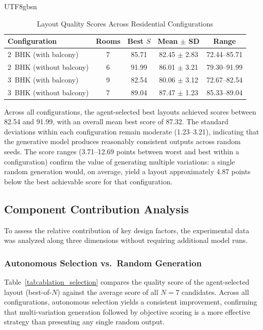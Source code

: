 \documentclass[11pt]{article}
\begin{document}
\begin{CJK}{UTF8}{gbsn}
\begin{table}[!t]
\caption{Layout Quality Scores Across Residential Configurations}
\centering
\begin{tabular}{|l|c|c|c|c|}
\hline
\textbf{Configuration} & \textbf{Rooms} & \textbf{Best $S$} & \textbf{Mean $\pm$ SD} & \textbf{Range} \\
\hline
2~BHK (with balcony) & 7 & 85.71 & 82.45 $\pm$ 2.83 & 72.44--85.71 \\
\hline
2~BHK (without balcony) & 6 & 91.99 & 86.01 $\pm$ 3.21 & 79.30--91.99 \\
\hline
3~BHK (with balcony) & 9 & 82.54 & 80.06 $\pm$ 3.12 & 72.67--82.54 \\
\hline
3~BHK (without balcony) & 7 & 89.04 & 87.47 $\pm$ 1.23 & 85.33--89.04 \\
\hline
\end{tabular}
\label{tab:quality_scores}
\end{table}

Across all configurations, the agent-selected best layouts achieved scores between 82.54 and 91.99, with an overall mean best score of 87.32. The standard deviations within each configuration remain moderate (1.23--3.21), indicating that the generative model produces reasonably consistent outputs across random seeds. The score ranges (3.71--12.69 points between worst and best within a configuration) confirm the value of generating multiple variations: a single random generation would, on average, yield a layout approximately 4.87 points below the best achievable score for that configuration.

\subsection*{Component Contribution Analysis}

To assess the relative contribution of key design factors, the experimental data was analyzed along three dimensions without requiring additional model runs.

\subsubsection*{Autonomous Selection vs.\ Random Generation}
Table~\ref{tab:ablation_selection} compares the quality score of the agent-selected layout (best-of-$N$) against the average score of all $N=7$ candidates. Across all configurations, autonomous selection yields a consistent improvement, confirming that multi-variation generation followed by objective scoring is a more effective strategy than presenting any single random output.


\end{CJK}
\end{document}
